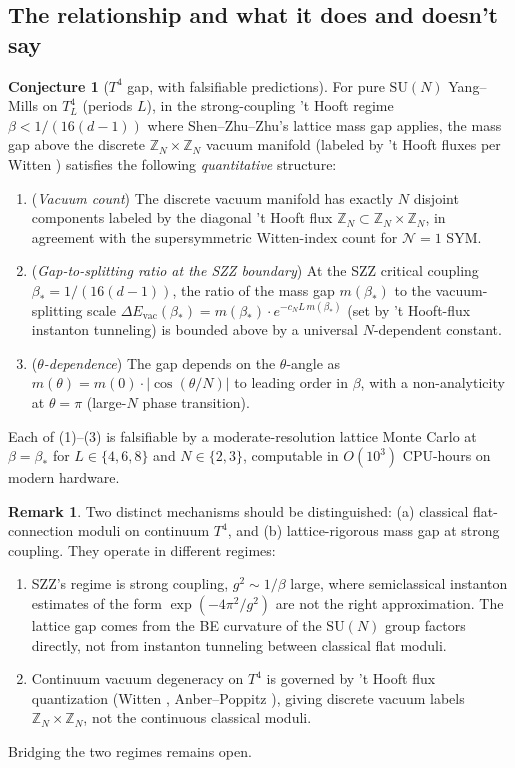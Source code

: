 \documentclass[11pt,letterpaper]{article}
\theoremstyle{definition}
\newtheorem{remark}[theorem]{Remark}
\newtheorem{conjecture}[theorem]{Conjecture}
\newcommand{\bbZ}{\mathbb{Z}}
\begin{document}
\subsection{The relationship and what it does and doesn't say}

\begin{conjecture}[$T^4$ gap, with falsifiable predictions]\label{conj:T4-degeneracy}
For pure $\mathrm{SU}(N)$ Yang--Mills on $T^4_L$ (periods $L$), in the strong-coupling 't Hooft regime $\beta < 1/(16(d-1))$ where Shen--Zhu--Zhu's lattice mass gap applies, the mass gap above the discrete $\bbZ_N\times\bbZ_N$ vacuum manifold (labeled by 't Hooft fluxes per Witten \cite{Witten1982}) satisfies the following \emph{quantitative} structure:
\begin{enumerate}[label=(\arabic*)]
\item (\emph{Vacuum count}) The discrete vacuum manifold has exactly $N$ disjoint components labeled by the diagonal 't Hooft flux $\bbZ_N\subset \bbZ_N\times\bbZ_N$, in agreement with the supersymmetric Witten-index count for $\mathcal{N}=1$ SYM.
\item (\emph{Gap-to-splitting ratio at the SZZ boundary}) At the SZZ critical coupling $\beta_* = 1/(16(d-1))$, the ratio of the mass gap $m(\beta_*)$ to the vacuum-splitting scale $\Delta E_{\mathrm{vac}}(\beta_*) = m(\beta_*)\cdot e^{-c_N L\,m(\beta_*)}$ (set by 't Hooft-flux instanton tunneling) is bounded above by a universal $N$-dependent constant.
\item (\emph{$\theta$-dependence}) The gap depends on the $\theta$-angle as $m(\theta) = m(0) \cdot |\cos(\theta/N)|$ to leading order in $\beta$, with a non-analyticity at $\theta = \pi$ (large-$N$ phase transition).
\end{enumerate}
Each of (1)--(3) is falsifiable by a moderate-resolution lattice Monte Carlo at $\beta = \beta_*$ for $L \in \{4, 6, 8\}$ and $N \in \{2, 3\}$, computable in $O(10^3)$ CPU-hours on modern hardware.
\end{conjecture}

\begin{remark}\label{rmk:T4-corrections}
Two distinct mechanisms should be distinguished: (a) classical flat-connection moduli on continuum $T^4$, and (b) lattice-rigorous mass gap at strong coupling. They operate in different regimes:
\begin{enumerate}[label=(\roman*)]
\item SZZ's regime is strong coupling, $g^2 \sim 1/\beta$ large, where semiclassical instanton estimates of the form $\exp(-4\pi^2/g^2)$ are not the right approximation. The lattice gap comes from the BE curvature of the $\mathrm{SU}(N)$ group factors directly, not from instanton tunneling between classical flat moduli.
\item Continuum vacuum degeneracy on $T^4$ is governed by 't Hooft flux quantization (Witten \cite{Witten1982}, Anber--Poppitz \cite{AnberPoppitz2025}), giving discrete vacuum labels $\bbZ_N \times \bbZ_N$, not the continuous classical moduli.
\end{enumerate}
Bridging the two regimes remains open.
\end{remark}
\end{document}

